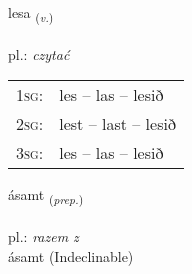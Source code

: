 \documentclass[frontgrid, backgrid]{flacards}\usepackage[]{graphicx}\usepackage[]{xcolor}
\begin{document}
\renewcommand{\flhead}{\vskip5pt \fboxsep=0pt {\small\bfseries\footnotesize Sagnorð | czasownik}}
\renewcommand{\fcfoot}{\vskip5pt \fboxsep=0pt \hspace{2pt}{\small\bfseries\footnotesize 1K}}

\renewcommand{\blhead}{\vskip5pt {\small\bfseries\footnotesize Sagnorð | czasownik }}
\renewcommand{\bcfoot}{\vskip5pt \hspace{2pt}{\small\bfseries\footnotesize 1K}}


{lesa \small{\textsubscript{(\textit{v.})}} \\[1ex] %
\textphonetic{[lɛːsa]} \\
pl.: \emph{czytać} \\  [2ex]
\renewcommand*{\arraystretch}{0.8}
\begin{tabular}{p{1cm}l}
\textsc{1sg}: & les -- las -- lesið \\ 
\textsc{2sg}: & lest -- last -- lesið \\ 
\textsc{3sg}: & les -- las -- lesið \\ 
\end{tabular}
}


\renewcommand{\flhead}{\vskip5pt \fboxsep=0pt {\small\bfseries\footnotesize Forsetning | przyimek}}
\renewcommand{\fcfoot}{\vskip5pt \fboxsep=0pt \hspace{2pt}{\small\bfseries\footnotesize 1K}}

\renewcommand{\blhead}{\vskip5pt {\small\bfseries\footnotesize Forsetning | przyimek }}
\renewcommand{\bcfoot}{\vskip5pt \hspace{2pt}{\small\bfseries\footnotesize 1K}}


{ásamt \small{\textsubscript{(\textit{prep.})}} \\[1ex]
\textphonetic{[auːsam̥t]} \\
pl.: \emph{razem z} \\  [2ex]
ásamt (Indeclinable)}

\renewcommand{\flhead}{\vskip5pt \fboxsep=0pt {\small\bfseries\footnotesize Sagnorð | czasownik}}
\renewcommand{\fcfoot}{\vskip5pt \fboxsep=0pt \hspace{2pt}{\small\bfseries\footnotesize 1K}}
\end{document}
